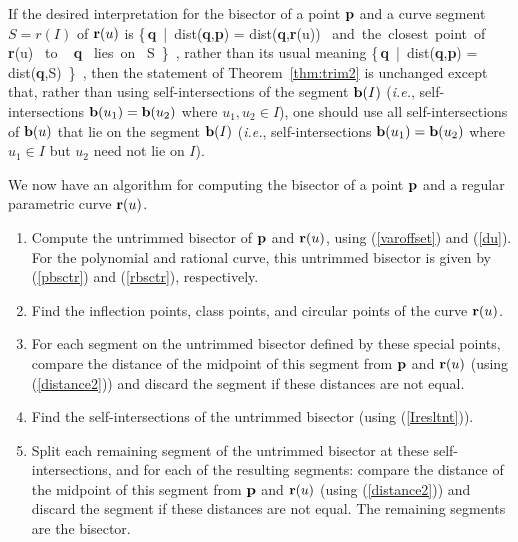 \begin{rmk}
{\rm
If the desired interpretation for the bisector of a point ${\bf p}$
and a curve segment $S = r(I)$ of ${\bf r}(u)$ is
\be
        \{\,{\bf q}\ |\ {\rm dist}({\bf q},{\bf p})
                = {\rm dist}({\bf q},{\bf r}(u))
                {\rm \ and\ the\ closest\ point\ of\ }
                {\bf r}(u) {\rm \ to \ } {\bf q} {\rm \ lies\ on\ } S \,\} \,,
\ee
rather than its usual meaning
\be
        \{\,{\bf q}\ |\ {\rm dist}({\bf q},{\bf p}) =
            {\rm dist}({\bf q},S) \,\} \,,
\ee
then the statement of Theorem~\ref{thm:trim2} is unchanged except that,
rather than using self-intersections of the segment ${\bf b}(I)$
({\it i.e.}, self-intersections ${\bf b}(u_1) = {\bf b}(u_2)$
where $u_1, u_2 \in I$),
one should use all self-intersections of ${\bf b}(u)$ that lie on
the segment ${\bf b}(I)$
({\it i.e.}, self-intersections ${\bf b}(u_1) = {\bf b}(u_2)$
where $u_1 \in I$ but $u_2$ need not lie on $I$).
}
\end{rmk}

We now have an algorithm for computing the bisector of a point
${\bf p}$ and a regular parametric curve ${\bf r}(u)$.

\begin{enumerate}
\item
        Compute the untrimmed bisector of ${\bf p}$ and ${\bf r}(u)$,
        using (\ref{varoffset}) and (\ref{du}).
        For the polynomial and rational curve, this untrimmed bisector
        is given by (\ref{pbsctr}) and (\ref{rbsctr}), respectively.
\item
        Find the inflection points, class points, and circular points
        of the curve ${\bf r}(u)$.
\item
        For each segment on the untrimmed bisector defined by these
        special points, compare the distance of the midpoint of this
        segment from ${\bf p}$ and ${\bf r}(u)$ (using (\ref{distance2}))
        and discard the segment if these distances are not equal.
\item
        Find the self-intersections of the untrimmed bisector
        (using (\ref{Iresltnt})).
\item
        Split each remaining segment of the untrimmed bisector
        at these self-intersections, and for each of the resulting
        segments: compare the distance of the midpoint of this
        segment from ${\bf p}$ and ${\bf r}(u)$ (using (\ref{distance2}))
        and discard the segment if these distances are not equal.
        The remaining segments are the bisector.
\end{enumerate}

